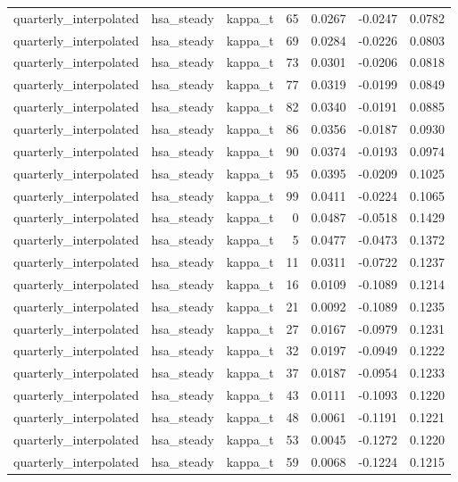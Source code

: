 \begin{tabular}{lllrrrr}
quarterly\_interpolated & hsa\_steady & kappa\_t & 65 & 0.0267 & -0.0247 & 0.0782 \\
quarterly\_interpolated & hsa\_steady & kappa\_t & 69 & 0.0284 & -0.0226 & 0.0803 \\
quarterly\_interpolated & hsa\_steady & kappa\_t & 73 & 0.0301 & -0.0206 & 0.0818 \\
quarterly\_interpolated & hsa\_steady & kappa\_t & 77 & 0.0319 & -0.0199 & 0.0849 \\
quarterly\_interpolated & hsa\_steady & kappa\_t & 82 & 0.0340 & -0.0191 & 0.0885 \\
quarterly\_interpolated & hsa\_steady & kappa\_t & 86 & 0.0356 & -0.0187 & 0.0930 \\
quarterly\_interpolated & hsa\_steady & kappa\_t & 90 & 0.0374 & -0.0193 & 0.0974 \\
quarterly\_interpolated & hsa\_steady & kappa\_t & 95 & 0.0395 & -0.0209 & 0.1025 \\
quarterly\_interpolated & hsa\_steady & kappa\_t & 99 & 0.0411 & -0.0224 & 0.1065 \\
quarterly\_interpolated & hsa\_steady & kappa\_t & 0 & 0.0487 & -0.0518 & 0.1429 \\
quarterly\_interpolated & hsa\_steady & kappa\_t & 5 & 0.0477 & -0.0473 & 0.1372 \\
quarterly\_interpolated & hsa\_steady & kappa\_t & 11 & 0.0311 & -0.0722 & 0.1237 \\
quarterly\_interpolated & hsa\_steady & kappa\_t & 16 & 0.0109 & -0.1089 & 0.1214 \\
quarterly\_interpolated & hsa\_steady & kappa\_t & 21 & 0.0092 & -0.1089 & 0.1235 \\
quarterly\_interpolated & hsa\_steady & kappa\_t & 27 & 0.0167 & -0.0979 & 0.1231 \\
quarterly\_interpolated & hsa\_steady & kappa\_t & 32 & 0.0197 & -0.0949 & 0.1222 \\
quarterly\_interpolated & hsa\_steady & kappa\_t & 37 & 0.0187 & -0.0954 & 0.1233 \\
quarterly\_interpolated & hsa\_steady & kappa\_t & 43 & 0.0111 & -0.1093 & 0.1220 \\
quarterly\_interpolated & hsa\_steady & kappa\_t & 48 & 0.0061 & -0.1191 & 0.1221 \\
quarterly\_interpolated & hsa\_steady & kappa\_t & 53 & 0.0045 & -0.1272 & 0.1220 \\
quarterly\_interpolated & hsa\_steady & kappa\_t & 59 & 0.0068 & -0.1224 & 0.1215 \\

\end{tabular}
